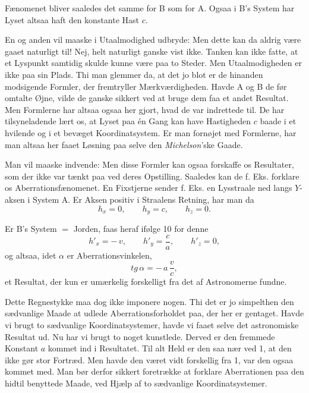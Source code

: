 \documentclass[12pt,a4paper]{article}
\newcommand{\opage}[1]{\marginnote{\footnotesize\textit{[#1]}}}
\begin{document}
Fænomenet bliver saaledes det samme for B som for A. Ogsaa i B's System
\guillemotright har Lyset altsaa haft\guillemotleft{} den konstante Hast $c$.

En og anden vil maaske i Utaalmodighed udbryde: Men dette kan da aldrig være
gaaet naturligt til! Nej, helt naturligt ganske vist ikke. Tanken kan ikke
fatte, at et Lyspunkt samtidig skulde kunne være paa to Steder. Men
Utaalmodigheden er ikke paa sin Plads. Thi man glemmer da, at det jo blot er de
hinanden modsigende Formler, der fremtryller Mærkværdigheden. Havde A og B de
før omtalte Øjne, vilde de ganske sikkert ved at bruge dem faa
\opage{22} et andet Resultat. Men Formlerne har altsaa ogsaa her gjort, hvad de var
indrettede til. De har tilsyneladende lært os, at Lyset paa én Gang kan have
Hastigheden $c$ baade i et hvilende og i et bevæget Koordinatsystem. Er man
fornøjet med Formlerne, har man altsaa her faaet
\guillemotright Løsning\guillemotleft{} paa selve den \emph{Michelson}'ske
Gaade.

Man vil maaske indvende: Men disse Formler kan ogsaa forskaffe os Resultater,
som der ikke var tænkt paa ved deres Opstilling. Saaledes kan de f. Eks.
forklare os Aberrationsfænomenet. En Fixstjerne sender f. Eks. en Lysstraale
ned langs $Y$-aksen i System A. Er Aksen positiv i Straalens Retning, har man
da
\[
  h_{x} = 0, \qquad h_{y} = c, \qquad h_{z} = 0.
\]

Er B's System $=$ Jorden, faas heraf ifølge 10 for denne
\[
  h'_{x} = -\,v, \qquad h'_{y} = \frac{c}{a}, \qquad h'_{z} = 0,
\]
og altsaa, idet $\alpha$ er Aberrationsvinkelen,
\[
  \mathit{tg}\,\alpha = -\,a\,\frac{v}{c},
\]
et Resultat, der kun er umærkelig forskelligt fra det af Astronomerne fundne.

Dette Regnestykke maa dog ikke imponere nogen. Thi det er jo simpelthen den
sædvanlige Maade at udlede Aberrationsforholdet paa, der her er gentaget. Havde
vi brugt to sædvanlige Koordinatsystemer, havde vi faaet selve det astronomiske
Resultat ud. Nu har vi brugt to noget kunstlede. Derved er den fremmede
Konstant $a$ kommet ind i Resultatet. Til alt Held er den saa nær ved 1, at den
ikke gør stor Fortræd. Men havde den været vidt forskellig fra 1, var den ogsaa
kommet med. Man bør derfor sikkert foretrække at forklare Aberrationen paa den
hidtil benyttede Maade, ved Hjælp af to sædvanlige Koordinatsystemer.
\end{document}
